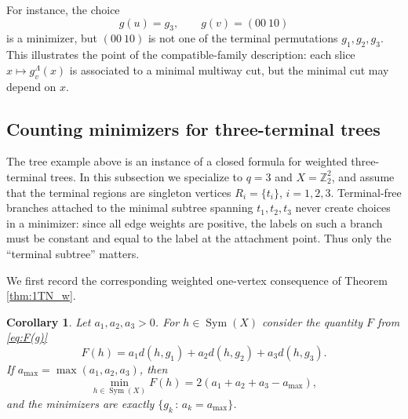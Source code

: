 \documentclass[11pt,oneside,letterpaper]{article}
\numberwithin{equation}{section}
\newtheorem{corollary}[theorem]{Corollary}
\theoremstyle{definition}
\theoremstyle{remark}
\DeclareMathOperator{\Sym}{Sym}
\begin{document}
  For instance, the choice
  \begin{equation}
    g(u)=g_3,\qquad g(v)=(00\ 10)
  \end{equation}
  is a minimizer, but $(00\ 10)$ is not one of the terminal
  permutations $g_1,g_2,g_3$.
  This illustrates the point of the
  compatible-family description: each slice $x\mapsto g^\Lambda_v(x)$ is
  associated to a minimal multiway cut, but the minimal cut may depend on
  $x$.

\subsection{Counting minimizers for three-terminal trees}

The tree example above is an instance of a closed formula for weighted
three-terminal trees.  In this subsection we specialize to $q=3$ and $X=\mathbb{Z}_2^2$,
and assume that the terminal regions are singleton vertices $R_i=\{t_i\}$, $i=1,2,3$. Terminal-free branches attached to the minimal subtree spanning
$t_1,t_2,t_3$ never create choices in a minimizer: since all edge
weights are positive, the labels on such a branch must be constant and
equal to the label at the attachment point. Thus only the ``terminal subtree'' matters.

We first record the corresponding weighted one-vertex consequence of
Theorem \ref{thm:1TN_w}.

\begin{corollary}
  \label{cor:weighted-q3-one-vertex}
  Let $a_1,a_2,a_3>0$.  For $h\in \Sym(X)$ consider the quantity $F$ from \eqref{eq:F(g)}
  \begin{equation}
    F(h)=a_1d(h,g_1)+a_2d(h,g_2)+a_3d(h,g_3).
  \end{equation}
  If $a_{\max}=\max(a_1,a_2,a_3)$, then
  \begin{equation}
    \label{eq:weighted-q3-one-vertex-value}
    \min_{h\in \Sym(X)}F(h)=2(a_1+a_2+a_3-a_{\max}),
  \end{equation}
  and the minimizers are exactly $\{g_k \, : \, a_k=a_{\max}\}$.
\end{corollary}
\end{document}
